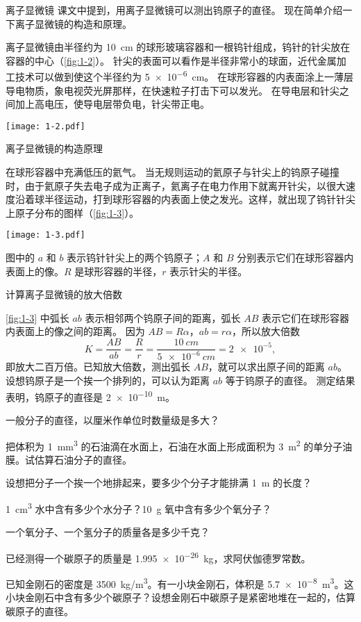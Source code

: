 \begin{Reading}{离子显微镜}
课文中提到，用离子显微镜可以测出钨原子的直径。
现在简单介绍一下离子显微镜的构造和原理。

离子显微镜由半径约为 \qty{10}{cm} 的球形玻璃容器和一根钨针组成，钨针的针尖放在容器的中心（\cref{fig:1-2}）。
针尖的表面可以看作是半径非常小的球面，近代金属加工技术可以做到使这个半径约为 \qty{5e-6}{cm}。
在球形容器的内表面涂上一薄层导电物质，象电视荧光屏那样，在快速粒子打击下可以发光。
在导电层和针尖之间加上高电压，使导电层带负电，针尖带正电。

\begin{figurehere}
  \begin{minipage}{\linewidth}\centering
    \texttt{[image: 1-2.pdf]}
    \caption{离子显微镜的构造原理}\label{fig:1-2}
  \end{minipage}
\end{figurehere}

在球形容器中充满低压的氦气。
当无规则运动的氦原子与针尖上的钨原子碰撞时，由于氦原子失去电子成为正离子，氦离子在电力作用下就离开针尖，以很大速度沿着球半径运动，打到球形容器的内表面上使之发光。这样，就出现了钨针针尖上原子分布的图样（\cref{fig:1-3}）。

\begin{figurehere}
  \texttt{[image: 1-3.pdf]}
  {\par\footnotesize 图中的 $a$ 和 $b$ 表示钨针针尖上的两个钨原子；$A$ 和 $B$ 分别表示它们在球形容器内表面上的像。$R$ 是球形容器的半径，$r$ 表示针尖的半径。}
  \caption{计算离子显微镜的放大倍数}\label{fig:1-3}
\end{figurehere}

\cref{fig:1-3} 中弧长 $ab$ 表示相邻两个钨原子间的距离，弧长 $AB$ 表示它们在球形容器内表面上的像之间的距离。
因为 $AB=R\alpha$，$ab=r\alpha$，所以放大倍数
\[K=\frac{AB}{ab}=\frac{R}{r}=\frac{\qty{10}{cm}}{\qty{5e-6}{cm}}=\num{2e-5},\]
即放大二百万倍。已知放大倍数，测出弧长 $AB$，就可以求出原子间的距离 $ab$。
设想钨原子是一个挨一个排列的，可以认为距离 $ab$ 等于钨原子的直径。
测定结果表明，钨原子的直径是 \qty{2e-10}{m}。
\end{Reading}

\begin{Practice}
\begin{question}
  \item  一般分子的直径，以厘米作单位时数量级是多大？
  \item  把体积为 \qty{1}{mm^3} 的石油滴在水面上，石油在水面上形成面积为 \qty{3}{m^2} 的单分子油膜。试估算石油分子的直径。
  \item  设想把分子一个挨一个地排起来，要多少个分子才能排满 \qty{1}{m} 的长度？
  \item  \qty{1}{cm^3} 水中含有多少个水分子？\qty{10}{g} 氧中含有多少个氧分子？
  \item  一个氧分子、一个氢分子的质量各是多少千克？
  \item  已经测得一个碳原子的质量是 \qty{1.995e-26}{kg}，求阿伏伽德罗常数。
  \item  已知金刚石的密度是 \qty{3500}{kg/m^3}。有一小块金刚石，体积是 \qty{5.7e-8}{m^3}。这小块金刚石中含有多少个碳原子？设想金刚石中碳原子是紧密地堆在一起的，估算碳原子的直径。
\end{question}
\end{Practice}

